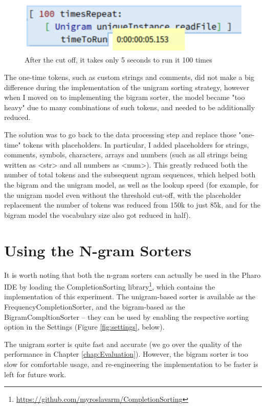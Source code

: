 \begin{figure}[H]
    \centering
    \includegraphics[width=0.7\linewidth]{images/unigramTimeToRunFast.png}
    \caption{After the cut off, it takes only 5 seconds to run it 100 times}
    \label{fig:sorterFast}
\end{figure}

The one-time tokens, such as custom strings and comments, did not make a big difference during the implementation of the unigram sorting strategy, however when I moved on to implementing the bigram sorter, the model became "too heavy" due to many combinations of such tokens, and needed to be additionally reduced.

The solution was to go back to the data processing step and replace those "one-time" tokens with placeholders. In particular, I added placeholders for strings, comments, symbols, characters, arrays and numbers (such as all strings being written as <str> and all numbers as <num>). This greatly reduced both the number of total tokens and the subsequent ngram sequences, which helped both the bigram and the unigram model, as well as the lookup speed (for example, for the unigram model even without the threshold cut-off, with the placeholder replacement the number of tokens was reduced from 150k to just 85k, and for the bigram model the vocabulary size also got reduced in half).

\section{Using the N-gram Sorters}
\label{sec:ProposedSolution-Usage}
It is worth noting that both the n-gram sorters can actually be used in the Pharo IDE by loading the CompletionSorting library\footnote{\url{https://github.com/myroslavarm/CompletionSorting}}, which contains the implementation of this experiment. The unigram-based sorter is available as the FrequencyCompletionSorter, and the bigram-based as the BigramCompltionSorter -- they can be used by enabling the respective sorting option in the Settings (Figure \ref{fig:settings}, below).

The unigram sorter is quite fast and accurate (we go over the quality of the performance in Chapter \ref{chap:Evaluation}). However, the bigram sorter is too slow for comfortable usage, and re-engineering the implementation to be faster is left for future work.

